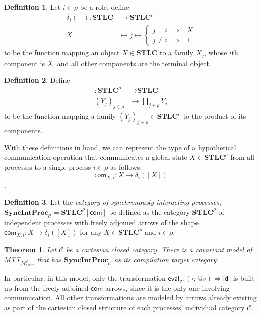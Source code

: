 \documentclass{scrartcl}
\theoremstyle{definition}
\newtheorem{definition}{Definition}
\theoremstyle{plain}
\newtheorem{theorem}{Theorem}
\begin{document}
\begin{definition}
  Let $i\in\rho$ be a role, define
  \begin{align*}
    \delta_i({-}) : \textbf{STLC} &\to \textbf{STLC}^\rho \\
    X &\mapsto j \mapsto \begin{cases}j = i \implies &X\\j \neq i \implies &1 \end{cases}
  \end{align*}
  to be the function mapping an object $X \in \textbf{STLC}$ to a family
  $X_j$, whose $i$th component is $X$, and all other components are the
  terminal object.
\end{definition}

\begin{definition} Define
  \begin{align*}
    [{-}] : \textbf{STLC}^\rho &\to \textbf{STLC} \\
    (Y_j)_{j\in\rho} &\mapsto \prod_{j \in \rho} Y_j
  \end{align*}
  to be the function mapping a family $(Y_j)_{j\in\rho} \in \textbf{STLC}^\rho$
  to the product of its components.
\end{definition}

With these definitions in hand, we can represent the type of a hypothetical
communication operation that communicates a global state $X \in
\textbf{STLC}^\rho$ from all processes to a single process $i \in \rho$ as follows:
\[
  \textsf{com}_{X,i} : X \to \delta_i([X])
\].

\begin{definition}
  Let the \emph{category of synchronously interacting processes},
  $\textbf{SyncIntProc}_{\mathcal{C}} = \textbf{STLC}^\rho[\textsf{com}]$
  be defined as the category
  $\textbf{STLC}^\rho$ of independent processes with freely adjoined arrows of
  the shape $\textsf{com}_{X,i} : X \to \delta_i([X])$ for any $X \in
  \textbf{STLC}^\rho$ and $i \in \rho$.
\end{definition}

\begin{theorem}
  Let $\mathcal{C}$ be a cartesian closed category. There is a covariant model
  of MTT${}_{\mathcal{M}^\rho_{\textrm{Chor}}}$ that has
  $\textbf{SyncIntProc}_{\mathcal{C}}$ as its compilation target category.
\end{theorem}

In particular, in this model, only the transformation $\textsf{eval}_v : (\square ;
{}@ v) \Rightarrow \textsf{id}_\circ$ is built up from the freely adjoined
$\textsf{com}$ arrows, since it is the only one involving communication. All
other transformations are modeled by arrows already existing as part of the
cartesian closed structure of each processes' individual category $\mathcal{C}$.
\end{document}
